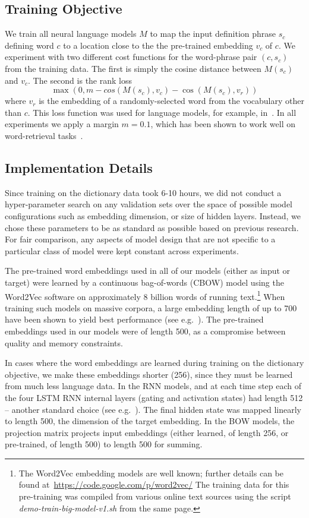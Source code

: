 \documentclass[11pt,letterpaper]{article}
\begin{document}
\subsection{Training Objective}

We train all neural language models \(M\) to map the input definition phrase \(s_c\) defining word \(c\) to a location close to the the pre-trained embedding \(v_c\) of \(c\). We experiment with two different cost functions for the word-phrase pair \((c,s_c)\) from the training data. The first is simply the cosine distance between \(M(s_c)\) and \(v_c\). The second is the rank loss 
\[
\max(0, m - cos(M(s_c),v_c)-\cos(M(s_c),v_r))
\] 
where \(v_r\) is the embedding of a randomly-selected word from the vocabulary other than \(c\). This loss function was used for language models, for example, in~\cite{huang2012improving}. In all experiments we apply a margin \(m = 0.1\), which has been shown to work well on word-retrieval tasks~\cite{bordes2015large}. 

\subsection{Implementation Details}
Since training on the dictionary data took 6-10 hours, we did not conduct a hyper-parameter search on any validation sets over the space of possible model configurations such as embedding dimension, or size of hidden layers. Instead, we chose these parameters to be as standard as possible based on previous research. For fair comparison, any aspects of model design that are not specific to a particular class of model were kept constant across experiments. 

The pre-trained word embeddings used in all of our models (either as input or target) were learned by a continuous bag-of-words (CBOW) model using the Word2Vec software on approximately 8 billion words of running text.\footnote{The Word2Vec embedding models are well known; further details can be found at~\url{https://code.google.com/p/word2vec/} The training data for this pre-training was compiled from various online text sources using the script \emph{demo-train-big-model-v1.sh} from the same page.} When training such models on massive corpora, a large embedding length of up to 700 have been shown to yield best performance (see e.g.~\cite{faruqui2014retrofitting}). The pre-trained embeddings used in our models were of length 500, as a compromise between quality and memory constraints.

In cases where the word embeddings are learned during training on the dictionary objective, we make these embeddings shorter (256), since they must be learned from much less language data. In the RNN models, and at each time step each of the four LSTM RNN internal layers (gating and activation states) had length 512 -- another standard choice (see e.g.~\cite{cho2014learning}). The final hidden state was mapped linearly to length 500, the dimension of the target embedding. In the BOW models, the projection matrix projects input embeddings (either learned, of length 256, or pre-trained, of length 500) to length 500 for summing. 
\end{document}
